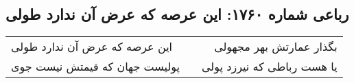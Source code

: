 \begin{center}
\section*{رباعی شماره ۱۷۶۰: این عرصه که عرض آن ندارد طولی}
\label{sec:1760}
\begin{longtable}{l p{0.5cm} r}
این عرصه که عرض آن ندارد طولی
&&
بگذار عمارتش بهر مجهولی
\\
پولیست جهان که قیمتش نیست جوی
&&
یا هست رباطی که نیرزد پولی
\\
\end{longtable}
\end{center}
